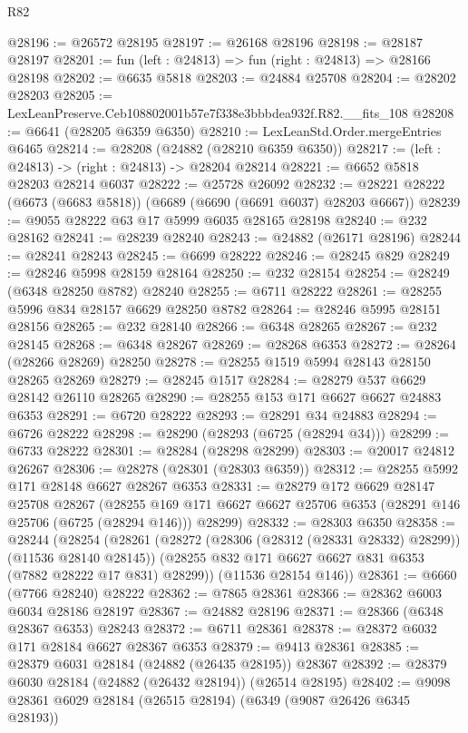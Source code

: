 \begin{lexlean}{R82}
\begin{coremodule}
@28196 := @26572 @28195
@28197 := @26168 @28196
@28198 := @28187 @28197
@28201 := fun (left : @24813) => fun (right : @24813) => @28166 @28198
@28202 := @6635 @5818
@28203 := @24884 @25708
@28204 := @28202 @28203
@28205 := LexLeanPreserve.Ceb108802001b57e7f338e3bbbdea932f.R82.__fits_108
@28208 := @6641 (@28205 @6359 @6350)
@28210 := LexLeanStd.Order.mergeEntries @6465
@28214 := @28208 (@24882 (@28210 @6359 @6350))
@28217 := (left : @24813) -> (right : @24813) -> @28204 @28214
@28221 := @6652 @5818 @28203 @28214 @6037
@28222 := @25728 @26092
@28232 := @28221 @28222 (@6673 (@6683 @5818)) (@6689 (@6690 (@6691 @6037) @28203 @6667))
@28239 := @9055 @28222 @63 @17 @5999 @6035 @28165 @28198
@28240 := @232 @28162
@28241 := @28239 @28240
@28243 := @24882 (@26171 @28196)
@28244 := @28241 @28243
@28245 := @6699 @28222
@28246 := @28245 @829
@28249 := @28246 @5998 @28159 @28164
@28250 := @232 @28154
@28254 := @28249 (@6348 @28250 @8782) @28240
@28255 := @6711 @28222
@28261 := @28255 @5996 @834 @28157 @6629 @28250 @8782
@28264 := @28246 @5995 @28151 @28156
@28265 := @232 @28140
@28266 := @6348 @28265
@28267 := @232 @28145
@28268 := @6348 @28267
@28269 := @28268 @6353
@28272 := @28264 (@28266 @28269) @28250
@28278 := @28255 @1519 @5994 @28143 @28150 @28265 @28269
@28279 := @28245 @1517
@28284 := @28279 @537 @6629 @28142 @26110 @28265
@28290 := @28255 @153 @171 @6627 @6627 @24883 @6353
@28291 := @6720 @28222
@28293 := @28291 @34 @24883
@28294 := @6726 @28222
@28298 := @28290 (@28293 (@6725 (@28294 @34)))
@28299 := @6733 @28222
@28301 := @28284 (@28298 @28299)
@28303 := @20017 @24812 @26267
@28306 := @28278 (@28301 (@28303 @6359))
@28312 := @28255 @5992 @171 @28148 @6627 @28267 @6353
@28331 := @28279
    @172
    @6629
    @28147
    @25708
    @28267
    (@28255 @169 @171 @6627 @6627 @25706 @6353 (@28291 @146 @25706 (@6725 (@28294 @146))) @28299)
@28332 := @28303 @6350
@28358 := @28244
    (@28254
      (@28261
        (@28272 (@28306 (@28312 (@28331 @28332) @28299)) (@11536 @28140 @28145))
        (@28255 @832 @171 @6627 @6627 @831 @6353 (@7882 @28222 @17 @831) @28299))
      (@11536 @28154 @146))
@28361 := @6660 (@7766 @28240) @28222
@28362 := @7865 @28361
@28366 := @28362 @6003 @6034 @28186 @28197
@28367 := @24882 @28196
@28371 := @28366 (@6348 @28367 @6353) @28243
@28372 := @6711 @28361
@28378 := @28372 @6032 @171 @28184 @6627 @28367 @6353
@28379 := @9413 @28361
@28385 := @28379 @6031 @28184 (@24882 (@26435 @28195)) @28367
@28392 := @28379 @6030 @28184 (@24882 (@26432 @28194)) (@26514 @28195)
@28402 := @9098 @28361 @6029 @28184 (@26515 @28194) (@6349 (@9087 @26426 @6345 @28193))

\end{coremodule}
\end{lexlean}
